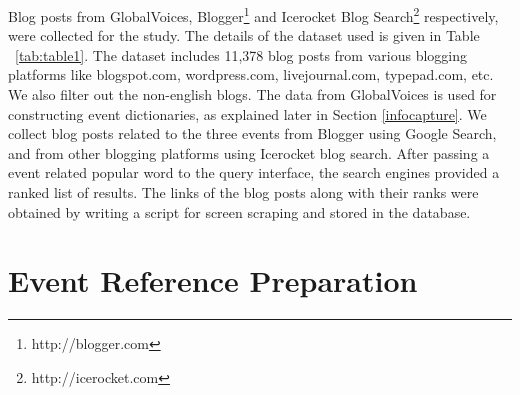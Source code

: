 
%
Blog posts from GlobalVoices, Blogger\footnote{http://blogger.com} and Icerocket Blog Search\footnote{http://icerocket.com} respectively, were collected for the study. The details of the dataset used is given in Table ~\ref{tab:table1}. The dataset includes 11,378 blog posts from various blogging platforms like blogspot.com, wordpress.com, livejournal.com, typepad.com, etc. We also filter out the non-english blogs. The data from GlobalVoices is used for constructing event dictionaries, as explained later in Section \ref{infocapture}. We collect blog posts related to the three events from Blogger using Google Search, and from other blogging platforms using Icerocket blog search. After passing a event related popular word to the query interface, the search engines provided a ranked list of results. The links of the blog posts along with their ranks were obtained by writing a script for screen scraping and stored in the database.






\section{Event Reference Preparation}

